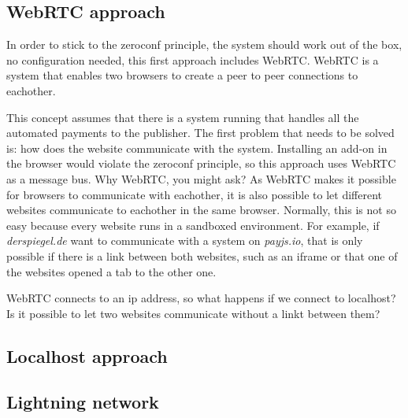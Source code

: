 \subsection{WebRTC approach}

In order to stick to the zeroconf principle, the system should work out of the box, no configuration needed, this first approach includes WebRTC. WebRTC is a system that enables two browsers to create a peer to peer connections to eachother.

This concept assumes that there is a system running that handles all the automated payments to the publisher. The first problem that needs to be solved is: how does the website communicate with the system. Installing an add-on in the browser would violate the zeroconf principle, so this approach uses WebRTC as a message bus. Why WebRTC, you might ask? As WebRTC makes it possible for browsers to communicate with eachother, it is also possible to let different websites communicate to eachother in the same browser. Normally, this is not so easy because every website runs in a sandboxed environment. For example, if \textit{derspiegel.de} want to communicate with a system on \textit{payjs.io}, that is only possible if there is a link between both websites, such as an iframe or that one of the websites opened a tab to the other one. 

WebRTC connects to an ip address, so what happens if we connect to localhost? Is it possible to let two websites communicate without a linkt between them? 

\subsection{Localhost approach}

\subsection{Lightning network}






